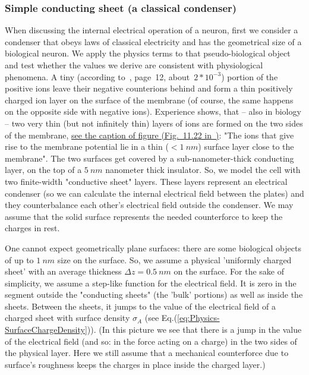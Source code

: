\subsubsection[Classical condenser]{Simple conducting sheet (a classical condenser)\label{sec:Physics-SimpleSheet}}

When discussing the internal electrical operation of a neuron, first we consider a condenser that obeys 
laws of classical electricity and has 
the geometrical size of a biological neuron.
We apply the physics terms to that pseudo-biological object
and test whether the values we derive are consistent with physiological phenomena. A tiny (according to~\cite{JohnstonWuNeurophysiology:1995}, page~12, about~$2*10^{-3}$) portion of the positive ions leave their negative
counterions behind and form a thin positively charged ion layer on the surface of the membrane (of course, the same happens on the opposite side with negative ions). Experience shows, that -- also in biology -- two very thin (but not infinitely thin) layers of ions are formed on the two sides of the membrane, \href{https://www.ncbi.nlm.nih.gov/books/NBK26910/figure/A2034/?report=objectonly}{see the caption of figure (Fig.~11.22 in~\cite{MolecularBiology:2002})}:
"The ions that give rise to the membrane potential lie
in a thin ($< 1\ nm$) surface layer close to the membrane".
The two surfaces get covered by a sub-nanometer-thick
conducting layer, on the top of a $5~nm$ nanometer thick insulator. 
So, we model the cell with two finite-width "conductive sheet" layers.
These layers represent an electrical condenser (so we can calculate the internal electrical field between the plates) and they counterbalance each other's electrical field outside the condenser.
We may assume that the solid surface represents the needed
counterforce to keep the charges in rest.

One cannot expect geometrically plane surfaces: there are 
some biological objects of up to $1~nm$ size on the surface. So, we assume
a physical 'uniformly charged sheet' with an average thickness $\Delta z=0.5~nm$ on the surface.
For the sake of simplicity, we assume a step-like function
for the electrical field. It is zero in the segment outside 
the "conducting sheets" (the 'bulk' portions) as well as inside the sheets.  Between the sheets, it jumps to the value of the electrical field of a charged sheet with surface density $\sigma_A$ (see Eq.(\ref{eq:Physics-SurfaceChargeDensity})).
(In this picture we see that there is a jump in the value of the electrical field (and so: in the force acting on a charge)
in the two sides of the physical layer. Here we still assume that a mechanical counterforce due to surface's roughness keeps the charges in place inside the charged layer.)

